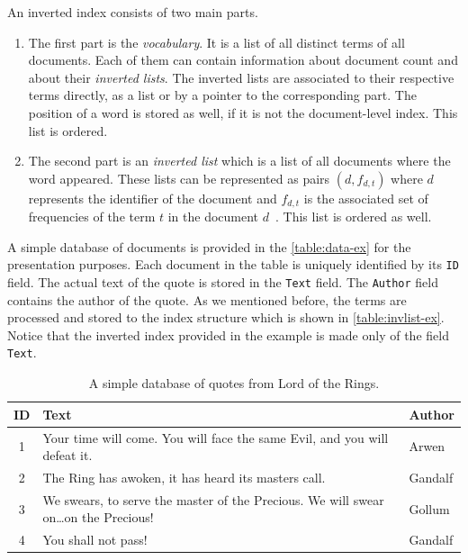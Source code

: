An inverted index consists of two main parts.
\begin{enumerate}
\item The first part is the \emph{vocabulary}. It is a list of all distinct terms of all documents. Each of them can contain information about document count and about their \emph{inverted lists}. The inverted lists are associated to their respective terms directly, as a list or by a pointer to the corresponding part. The position of a word is stored as well, if it is not the document-level index. This list is ordered.
\item The second part is an \emph{inverted list} which is a list of all documents where the word appeared. These lists can be represented as pairs \((d, f_{d,t})\) where \(d\) represents the identifier of the document and  \(f_{d,t}\) is the associated set of frequencies of the term \(t\) in the document \(d\)~\cite{invertedfiles}.
This list is ordered as well.
\end{enumerate}

A simple database of documents is provided in the \autoref{table:data-ex} for the presentation purposes. Each document in the table is uniquely identified by its \texttt{ID} field. The actual text of the quote is stored in the \texttt{Text} field. The \texttt{Author} field contains the author of the quote. As we mentioned before, the terms are processed and stored to the index structure which is shown in \autoref{table:invlist-ex}. Notice that the inverted index provided in the example is made only of the field \texttt{Text}.

\begin{table}[t]
\centering
\renewcommand{\arraystretch}{1.4}
\begin{tabular}{c p{20em} l}
\toprule
ID & Text & Author\\
\midrule
1 & Your time will come. You will face the same Evil, and you will defeat it. & Arwen \\
2 & The Ring has awoken, it has heard its masters call. & Gandalf \\
3 & We swears, to serve the master of the Precious. We will swear on\dots on the Precious! & Gollum \\
4 & You shall not pass! & Gandalf \\
\bottomrule
\end{tabular}
\caption{A simple database of quotes from Lord of the Rings.} 
\label{table:data-ex}
\end{table}

